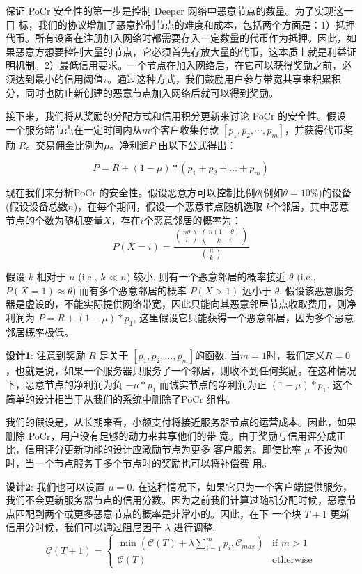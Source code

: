 \documentclass[a4paper]{article}
\begin{document}
保证 PoCr 安全性的第一步是控制 Deeper 网络中恶意节点的数量。为了实现这一目
标，我们的协议增加了恶意控制节点的难度和成本，包括两个方面是：1）抵押代币。所有设备在注册加入网络时都需要存入一定数量的代币作为抵押。因此，如果恶意方想要控制大量的节点，它必须首先存放大量的代币，这本质上就是利益证明机制。2）最低信用要求。一个节点在加入网络后，在它可以获得奖励之前，必须达到最小的信用阈值$\tau$。通过这种方式，我们鼓励用户参与带宽共享来积累积分，同时也防止新创建的恶意节点加入网络后就可以得到奖励。

接下来，我们将从奖励的分配方式和信用积分更新来讨论 PoCr 的安全性。假设
一个服务端节点在一定时间内从$m$个客户收集付款 $[p_1, p_2,\cdots,p_m]$，并获得代币奖励 $R$。交易佣金比例为$\mu$。净利润$P$ 由以下公式得出：

\begin{equation}
    P = R + (1-\mu)*(p_1+p_2+\ldots+p_m)
\end{equation}

现在我们来分析PoCr 的安全性。假设恶意方可以控制比例$\theta$(例如$\theta=10\%$)的设备(假设设备总数$n$)，在每个期间，假设一个恶意节点随机选取 $k$个邻居，其中恶意节点的个数为随机变量$X$，存在$i$个恶意邻居的概率为：
\begin{equation}
    P(X=i) = \frac{\binom{n\theta}{i} \binom{n(1-\theta)}{k-i}}{\binom{n}{k}}
\end{equation}

假设 $k$ 相对于 $n$ (i.e., $k \ll n$) 较小, 则有一个恶意邻居的概率接近 $\theta$ (i.e., $P(X=1) \approx \theta$) 而有多个恶意邻居的概率 $P(X>1)$ 远小于 $\theta$. 假设该恶意服务器是虚设的，不能实际提供网络带宽，因此只能向其恶意邻居节点收取费用，则净利润为 $P = R + (1-\mu)*p_1$, 这里假设它只能获得一个恶意邻居，因为多个恶意邻居概率极低。

\textbf{设计1}: 注意到奖励 $R$ 是关于 $[p_1,p_2,\ldots,p_m]$的函数.  当$m=1$时，我们定义$R=0$，也就是说，如果一个服务器只服务了一个邻居，则收不到任何奖励。在这种情况下，恶意节点的净利润为负 $-\mu*p_1$ 而诚实节点的净利润为正 $(1-\mu)*p_1$. 这个简单的设计相当于从我们的系统中删除了PoCr 组件。

我们的假设是，从长期来看，小额支付将接近服务器节点的运营成本。因此，如果删除 PoCr，用户没有足够的动力来共享他们的带 宽。由于奖励与信用评分成正比，信用评分更新功能的设计应激励节点为更多
客户服务。即使比率 $\mu$ 不设为0时，当一个节点服务于多个节点时的奖励也可以将补偿费
用。

\textbf{设计2}: 我们也可以设置 $\mu = 0$. 在这种情况下，如果它只为一个客户端提供服务，我们不会更新服务器节点的信用分数。因为之前我们计算过随机分配时候，恶意节点匹配到两个或更多恶意节点的概率是非常小的。因此，在下
一个块 $T+1$ 更新信用分时候，我们可以通过阻尼因子  $\lambda$ 进行调整:
\begin{equation}
    \mathcal{C}(T+1) = \left\{ \begin{array}{ll}
	\min(\mathcal{C}(T) + \lambda \sum_{i=1}^{m} p_i, \mathcal{C}_{max}) & \mbox{if $m>1$} \\
	\mathcal{C}(T)& \mbox{otherwise}
	\end{array} \right.
\end{equation}
\end{document}
